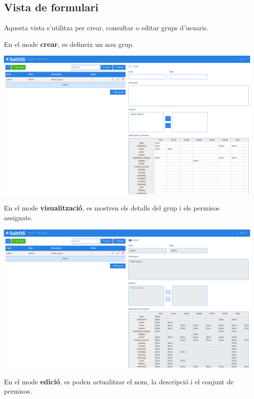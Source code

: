 \documentclass[a4paper]{article}
\begin{document}
\hypertarget{toc179}{}
\subsection{Vista de formulari}

Aquesta vista s'utilitza per crear, consultar o editar grups d'usuaris.

En el mode \textbf{crear}, es defineix un nou grup.

\begin{center}\includegraphics[width=1\textwidth]{../ujest/snaps/test-screenshots-js-screenshots-users-groups-create-ca-es-1-snap.png}\end{center}

En el mode \textbf{visualització}, es mostren els detalls del grup i els permisos assignats.

\begin{center}\includegraphics[width=1\textwidth]{../ujest/snaps/test-screenshots-js-screenshots-users-groups-view-1-ca-es-1-snap.png}\end{center}

En el mode \textbf{edició}, es poden actualitzar el nom, la descripció i el conjunt de permisos.
\end{document}
